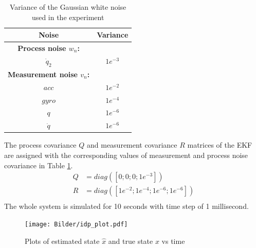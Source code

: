 \begin{table}[H]
    \centering
    \begin{tabular}{|c|c|}
    \hline
    Noise &Variance\\ \hline
    \textbf{Process noise $w_n$:}&\hspace{2mm} \\
    $\dot q_2$ &$1e^{-3}$ \\ \hline
    \textbf{Measurement noise $v_n$:}&\hspace{2mm} \\
     $acc$ &$1e^{-2}$ \\
     $gyro$ &$1e^{-4}$ \\
     $q$ &$1e^{-6}$\\ 
     $\dot q$ &$1e^{-6}$ \\ \hline
    \end{tabular}
    \caption{ Variance of the Gaussian white noise used in the experiment}
    \label{tab:idp_noise}
\end{table}

The process covariance $Q$ and measurement covariance $R$ matrices of the EKF are assigned with the corresponding values of measurement and process noise covariance in Table \ref{tab:idp_noise}.
$$  \begin{aligned}
    Q&=diag([0; 0; 0; 1e^{-3}]) \\
    R&=diag([1e^{-2}; 1e^{-4}; 1e^{-6}; 1e^{-6}]) \\
    \end{aligned}
    $$
The whole system is simulated for 10 seconds with time step of 1 millisecond.
\begin{figure}[H]
	\centering
	\texttt{[image: Bilder/idp\_plot.pdf]}
	\caption{ Plots of estimated state $\hat x$ and true state $x$ vs time}
	\label{fig:idp_plot}
\end{figure}

